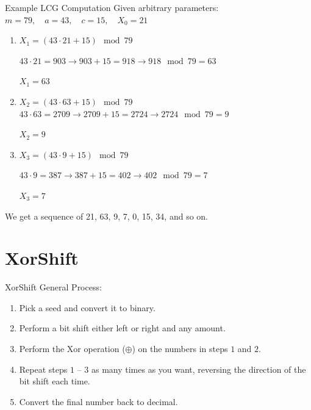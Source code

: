 \documentclass[aspectratio=169]{beamer}
\begin{document}
\begin{frame}{Example LCG Computation}
Given arbitrary parameters: $m = 79, \quad a = 43, \quad c = 15, \quad X_0 = 21$
\begin{enumerate}
    \item $X_1 = (43 \cdot 21 + 15) \mod 79$
    
        $43 \cdot 21 = 903  \rightarrow  903 + 15 = 918  \rightarrow  918 \mod 79 = 63$
        
        $X_1 = 63$
    \item $X_2 = (43 \cdot 63 + 15) \mod 79$
        $43 \cdot 63 = 2709  \rightarrow  2709 + 15 = 2724  \rightarrow  2724 \mod 79 = 9$
        
        $X_2 = 9$
    \item $X_3 = (43 \cdot 9 + 15) \mod 79$
    
        $43 \cdot 9 = 387  \rightarrow  387 + 15 = 402  \rightarrow  402 \mod 79 = 7$
        
        $X_3 = 7$
\end{enumerate}
We get a sequence of 21, 63, 9, 7, 0, 15, 34, and so on.

\end{frame}

\section{XorShift}

\begin{frame}{XorShift}
General Process:

\begin{enumerate}
    \item Pick a seed and convert it to binary.
    \item Perform a bit shift either left or right and any amount.
    \item Perform the Xor operation ($\oplus$) on the numbers in steps $1$ and $2$.
    \item Repeat steps $1$ -- $3$ as many times as you want, reversing the direction of the bit shift each time.
    \item Convert the final number back to decimal.
\end{enumerate}
\end{frame}
\end{document}
